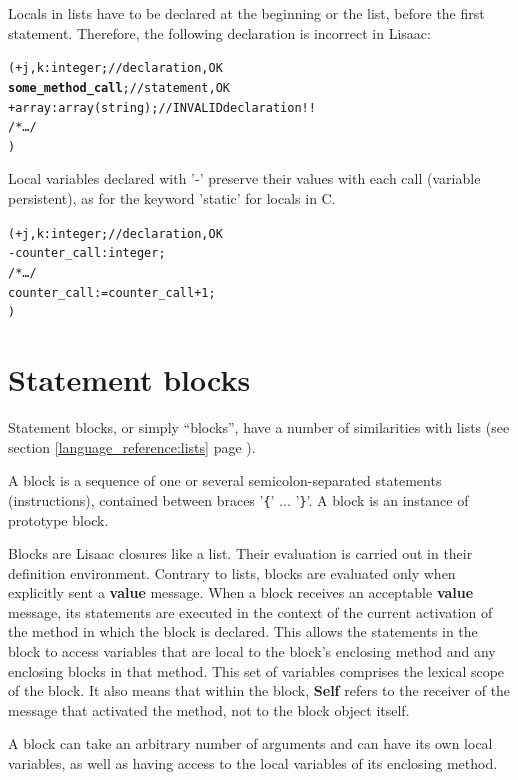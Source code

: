 \documentclass[11pt]{mybook}
\begin{document}
Locals in lists have to be declared at the beginning or the list,
before the first statement.
Therefore, the following declaration is incorrect in Lisaac:
\begin{alltt}
  ( + j,k:{\sc{}integer};         // declaration, OK
    {\bf{}some\_method\_call};      // statement, OK
    + array:{\sc{}array}({\sc{}string}); // INVALID declaration !!
    /* \ldots */
  )
\end{alltt}

Local variables declared with '-' preserve their values with 
each call (variable persistent), as for the keyword 'static' for locals in C.

\begin{alltt}
  ( + j,k:{\sc{}integer};         // declaration, OK
    - counter\_call:{\sc{}integer};
    /* \ldots */
    counter\_call := counter\_call + 1;
  )
\end{alltt}

\section{Statement blocks}
\label{language_reference:blocks}
%

Statement blocks, or simply ``blocks'', have a number of similarities
with lists (see section \ref{language_reference:lists} page \pageref{language_reference:lists}).

A block is a sequence of one or several semicolon-separated statements
(instructions), contained  between braces '{\tt{}\{}' ... '{\tt{}\}}'.
A block is an instance of prototype {\sc{}block}.

Blocks are Lisaac{} closures like a list.
Their evaluation is carried out in their definition environment. 
Contrary to lists, blocks are evaluated only when explicitly sent a
{\bf{}value} message. 
When a block receives an acceptable {\bf{}value} message, its
statements are executed in the context of the current activation of
the method in which the block is declared.
This allows the statements in the block to access variables that are
local to the  block's enclosing method and any enclosing blocks in
that method.  
This set of variables comprises the lexical scope of the block.
It also means that within the block, {\bf{}Self} refers to the receiver 
of the message that activated the method, not to the block object
itself. 

A block can take an arbitrary number of arguments and can have its own 
local variables, as well as having access to the local variables of its 
enclosing method. 
\end{document}
